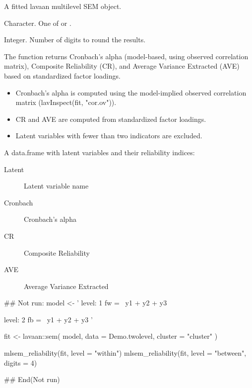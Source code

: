 \documentclass[a4paper]{book}
\begin{document}
%
\begin{Arguments}
\begin{ldescription}
\item[\code{fit}] A fitted lavaan multilevel SEM object.

\item[\code{level}] Character. One of  or .

\item[\code{digits}] Integer. Number of digits to round the results.
\end{ldescription}
\end{Arguments}
%
\begin{Details}
The function returns Cronbach's alpha (model-based, using observed
correlation matrix), Composite Reliability (CR), and Average Variance
Extracted (AVE) based on standardized factor loadings.


\begin{itemize}

\item{} Cronbach's alpha is computed using the model-implied observed
correlation matrix (lavInspect(fit, "cor.ov")).
\item{} CR and AVE are computed from standardized factor loadings.
\item{} Latent variables with fewer than two indicators are excluded.

\end{itemize}

\end{Details}
%
\begin{Value}
A data.frame with latent variables and their reliability indices:
\begin{description}

\item[Latent] Latent variable name
\item[Cronbach] Cronbach's alpha
\item[CR] Composite Reliability
\item[AVE] Average Variance Extracted

\end{description}

\end{Value}
%
\begin{Examples}
\begin{ExampleCode}
\#\# Not run: 
model <- '
level: 1
  fw =~ y1 + y2 + y3

level: 2
  fb =~ y1 + y2 + y3
'

fit <- lavaan::sem(
  model,
  data    = Demo.twolevel,
  cluster = "cluster"
)

mlsem_reliability(fit, level = "within")
mlsem_reliability(fit, level = "between", digits = 4)

## End(Not run)
\end{ExampleCode}
\end{Examples}
\end{document}
